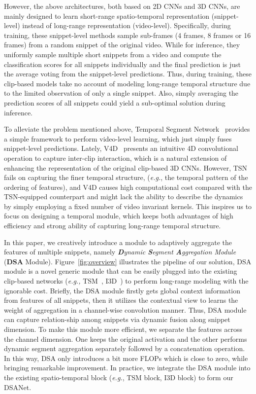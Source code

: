 \documentclass[sigconf]{acmart}
\begin{document}
However, the above architectures, both based on 2D CNNs and 3D CNNs, are mainly designed to learn short-range spatio-temporal representation (snippet-level) instead of long-range representation (video-level).
Specifically, during training, these snippet-level methods sample sub-frames (4 frames, 8 frames or 16 frames) from a random snippet of the original video.
While for inference, they uniformly sample multiple short snippets from a video and compute the classification scores for all snippets individually and the final prediction is just the average voting from the snippet-level predictions.
Thus, during training, these clip-based models take no account of modeling long-range temporal structure due to the limited observation of only a single snippet.
Also, simply averaging the prediction scores of all snippets could yield a sub-optimal solution during inference.

To alleviate the problem mentioned above, Temporal Segment Network~\cite{tsn} provides a simple framework to perform video-level learning, which just simply fuses snippet-level predictions. Lately, V4D~\cite{zhang2020v4d} presents an intuitive 4D convolutional operation to capture inter-clip interaction, which is a natural extension of enhancing the representation of the original clip-based 3D CNNs. However, TSN fails on capturing the finer temporal structure, (\emph{e.g.}, the temporal pattern of the ordering of features), and V4D causes high computational cost compared with the TSN-equipped counterpart and might lack the ability to describe the dynamics by simply employing a fixed number of video invariant kernels. This inspires us to focus on designing a temporal module, which keeps both advantages of high efficiency and strong ability of capturing long-range temporal structure.

In this paper, we creatively introduce a module to adaptively aggregate the features of multiple snippets, namely \emph{\textbf{D}ynamic \textbf{S}egment \textbf{A}ggregation Module} (\textbf{DSA} Module). 
Figure~\ref{fig:overview} illustrates the pipeline of our solution, DSA module is a novel generic module that can be easily plugged into the existing clip-based networks (\emph{e.g.,} TSM~\cite{tsm}, I3D~\cite{i3d}) to perform long-range modeling with the ignorable cost. 
Briefly, the DSA module firstly gets global context information from features of all snippets, then it utilizes the contextual view to learns the weight of aggregation in a channel-wise convolution manner.
Thus, DSA module can capture relation-ship among snippets via dynamic fusion along snippet dimension.
To make this module more efficient, we separate the features across the channel dimension. One keeps the original activation and the other performs dynamic segment aggregation separately followed by a concatenation operation.
In this way, DSA only introduces a bit more FLOPs which is close to zero, while bringing remarkable improvement. 
In practice, we integrate the DSA module into the existing spatio-temporal block (\emph{e.g.}, TSM block, I3D block) to form our DSANet.
\end{document}
